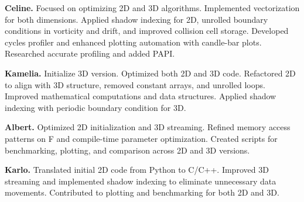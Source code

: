 \documentclass[letterpaper]{article}
\newcommand{\mypar}[1]{{\bf #1.}}
\begin{document}
\mypar{Celine}
Focused on optimizing 2D and 3D algorithms. Implemented vectorization for both dimensions. Applied shadow indexing for 2D, unrolled boundary conditions in vorticity and drift, and improved collision cell storage. Developed cycles profiler and enhanced plotting automation with candle-bar plots. Researched accurate profiling and added PAPI.

\mypar{Kamelia}
Initialize 3D version. Optimized both 2D and 3D code. Refactored 2D to align with 3D structure, removed constant arrays, and unrolled loops. Improved mathematical computations and data structures. Applied shadow indexing with periodic boundary condition for 3D.

\mypar{Albert}
Optimized 2D initialization and 3D streaming. Refined memory access patterns on F and compile-time parameter optimization. Created scripts for benchmarking, plotting, and comparison across 2D and 3D versions.

\mypar{Karlo}
Translated initial 2D code from Python to C/C++. Improved 3D streaming and implemented shadow indexing to eliminate unnecessary data movements. Contributed to plotting and benchmarking for both 2D and 3D.


\newpage

\balance


\end{document}
